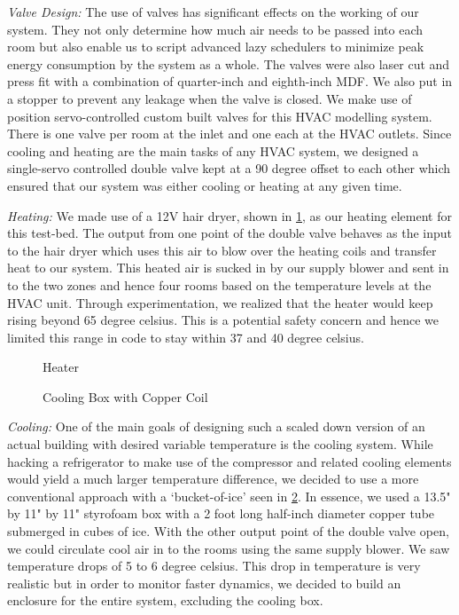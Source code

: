 \documentclass[a4paper,10pt,twocolumn]{article}
\begin{document}
\emph{Valve Design:}
The use of valves has significant effects on the working of our system.  They not only determine how much air needs to be passed into each room but also enable us to script advanced lazy  schedulers to minimize peak energy consumption by the system as a whole.  The valves were also laser cut and press fit with a combination of quarter-inch and eighth-inch MDF. We also put in a stopper to prevent any leakage when the valve is closed.  We make use of position servo-controlled custom built valves for this HVAC modelling system. There is one valve per room at the inlet and one each at the HVAC outlets. Since cooling and heating are the main tasks of any HVAC system, we designed a single-servo controlled double valve kept at a 90 degree offset to each other which ensured that our system was either cooling or heating at any given time.

\emph{Heating:}
We made use of a 12V hair dryer, shown in \ref{heater}, as our heating element for this test-bed. The output from one point of the double valve behaves as the input to the hair dryer which uses this air to blow over the heating coils and transfer heat to our system. This heated air is sucked in by our supply blower and sent in to the two zones and hence four rooms based on the temperature levels at the HVAC unit. Through experimentation, we realized that the heater would keep rising beyond 65 degree celsius. This is a potential safety concern and hence we limited this range in code to stay within 37 and 40 degree celsius.

\begin{figure}[t]
\centering
{}
\caption{Heater}
\label{heater}
\end{figure}

\begin{figure}[b]
\centering
{}
\caption{Cooling Box with Copper Coil}
\label{cooler}
\end{figure}

\emph{Cooling:}
One of the main goals of designing such a scaled down version of an actual building with desired variable temperature is the cooling system. While hacking a refrigerator to make use of the compressor and related cooling elements would yield a much larger temperature difference, we decided to use a more conventional approach with a ‘bucket-of-ice’ seen in \ref{cooler}. In essence, we used a 13.5" by 11" by 11" styrofoam box with a 2 foot long half-inch diameter copper tube submerged in cubes of ice. With the other output point of the double valve open, we could circulate cool air in to the rooms using the same supply blower. We saw temperature drops of 5 to 6 degree celsius. This drop in temperature is very realistic but in order to monitor faster dynamics, we decided to build an enclosure for the entire system, excluding the cooling box.
\end{document}

